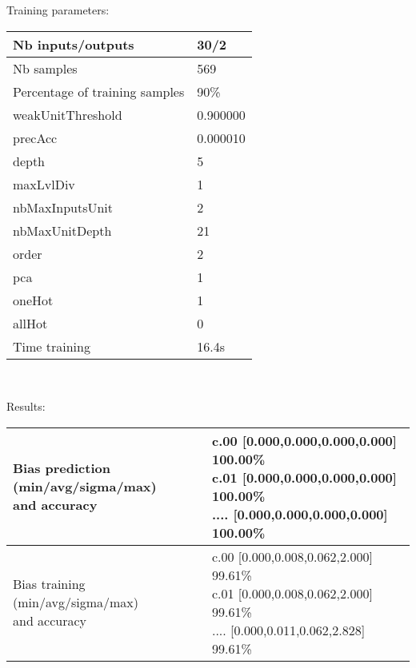 Training parameters:\\
\begin{center}
\begin{tabular}{|l|l|}
\hline
Nb inputs/outputs&30/2\\
\hline
Nb samples&569\\
\hline
Percentage of training samples&90\%\\
\hline
weakUnitThreshold&0.900000\\
\hline
precAcc&0.000010\\
\hline
depth&5\\
\hline
maxLvlDiv&1\\
\hline
nbMaxInputsUnit&2\\
\hline
nbMaxUnitDepth&21\\
\hline
order&2\\
\hline
pca&1\\
\hline
oneHot&1\\
\hline
allHot&0\\
\hline
Time training&16.4s\\
\hline
\end{tabular}\\
\end{center}\newline
Results:
\begin{center}
\begin{tabular}{|l|l|}
\hline
\makecell{Bias prediction (min/avg/sigma/max)\\and accuracy}&\makecell{c.00 [0.000,0.000,0.000,0.000] 100.00\%\\
c.01 [0.000,0.000,0.000,0.000] 100.00\%\\
.... [0.000,0.000,0.000,0.000] 100.00\%\\
}\\

\hline
\makecell{Bias training (min/avg/sigma/max)\\and accuracy}&\makecell{c.00 [0.000,0.008,0.062,2.000] 99.61\%\\
c.01 [0.000,0.008,0.062,2.000] 99.61\%\\
.... [0.000,0.011,0.062,2.828] 99.61\%\\
}\\
\hline
\end{tabular}\
\end{center}
